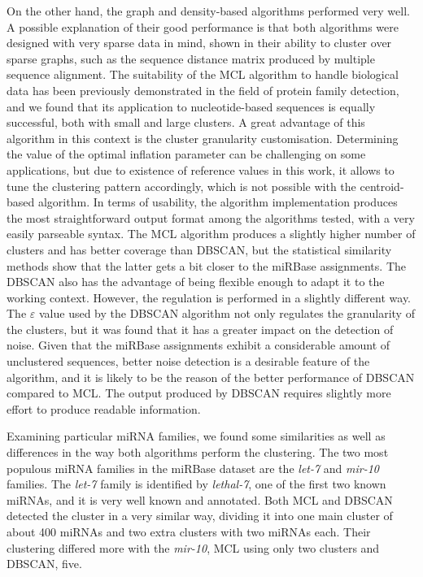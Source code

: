 \documentclass[nocrop]{bioinfo}
\begin{document}
On the other hand, the graph and density-based algorithms performed very well. A possible explanation of their good performance is that both algorithms were designed with very sparse data in mind, shown in their ability to cluster over sparse graphs, such as the sequence distance matrix produced by multiple sequence alignment. The suitability of the MCL algorithm to handle biological data has been previously demonstrated in the field of protein family detection, and we found that its application to nucleotide-based sequences is equally successful, both with small and large clusters. A great advantage of this algorithm in this context is the cluster granularity customisation. Determining the value of the optimal inflation parameter can be challenging on some applications, but due to existence of reference values in this work, it allows to tune the clustering pattern accordingly, which is not possible with the centroid-based algorithm. In terms of usability, the algorithm implementation produces the most straightforward output format among the algorithms tested, with a very easily parseable syntax. The MCL algorithm produces a slightly higher number of clusters and has better coverage than DBSCAN, but the statistical similarity methods show that the latter gets a bit closer to the miRBase assignments. The DBSCAN also has the advantage of being flexible enough to adapt it to the working context. However, the regulation is performed in a slightly different way. The $\varepsilon$ value used by the DBSCAN algorithm not only regulates the granularity of the clusters, but it was found that it has a greater impact on the detection of noise. Given that the miRBase assignments exhibit a considerable amount of unclustered sequences, better noise detection is a desirable feature of the algorithm, and it is likely to be the reason of the better performance of DBSCAN compared to MCL. The output produced by DBSCAN requires slightly more effort to produce readable information.

Examining particular miRNA families, we found some similarities as well as differences in the way both algorithms perform the clustering. The two most populous miRNA families in the miRBase dataset are the \textit{let-7} and \textit{mir-10} families. The \textit{let-7} family is identified by \textit{lethal-7}, one of the first two known miRNAs, and it is very well known and annotated. Both MCL and DBSCAN detected the cluster in a very similar way, dividing it into one main cluster of about 400 miRNAs and two extra clusters with two miRNAs each. Their clustering differed more with the \textit{mir-10}, MCL using only two clusters and DBSCAN, five.
\end{document}
